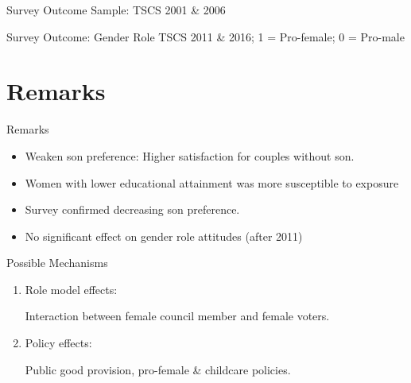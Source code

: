 \documentclass[
  10pt,
  ignorenonframetext,
  aspectratio=43,
]{beamer}
\providecommand{\tightlist}{%
  \setlength{\itemsep}{0pt}\setlength{\parskip}{0pt}}
\begin{document}
\begin{frame}

\end{frame}

\begin{frame}

\end{frame}

\begin{frame}{Survey Outcome}
\protect\hypertarget{survey-outcome}{}
Sample: TSCS 2001 \& 2006


\end{frame}

\begin{frame}{Survey Outcome: Gender Role}
\protect\hypertarget{survey-outcome-gender-role}{}
TSCS 2011 \& 2016; 1 = Pro-female; 0 = Pro-male


\end{frame}

\hypertarget{remarks}{%
\section{Remarks}\label{remarks}}

\begin{frame}{Remarks}
\begin{itemize}
\tightlist
\item
  Weaken son preference: Higher satisfaction for couples without son.
\item
  Women with lower educational attainment was more susceptible to
  exposure
\item
  Survey confirmed decreasing son preference.
\item
  No significant effect on gender role attitudes (after 2011)
\end{itemize}
\end{frame}

\begin{frame}{Possible Mechanisms}
\protect\hypertarget{possible-mechanisms}{}
\begin{enumerate}
\item
  Role model effects:

  Interaction between female council member and female voters.
\item
  Policy effects:

  Public good provision, pro-female \& childcare policies.
\end{enumerate}
\end{frame}
\end{document}
